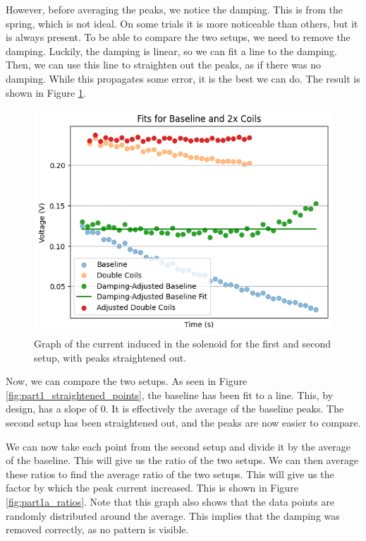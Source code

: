 \documentclass[11pt]{article}
\begin{document}
    However, before averaging the peaks, we notice the damping.
    This is from the spring, which is not ideal.
    On some trials it is more noticeable than others, but it is always present.
    To be able to compare the two setups, we need to remove the damping.
    Luckily, the damping is linear, so we can fit a line to the damping.
    Then, we can use this line to straighten out the peaks, as if there was no damping.
    While this propagates some error, it is the best we can do.
    The result is shown in Figure \ref{fig:part1a_straightened_points}.

    \begin{figure}[H]
        \centering
        \includegraphics[width=0.8\linewidth]{resources/images/part1a peaks straightened}
        \caption{Graph of the current induced in the solenoid for the first and second setup, with peaks straightened out.}
        \label{fig:part1a_straightened_points}
    \end{figure}

    Now, we can compare the two setups.
    As seen in Figure \ref{fig:part1_straightened_points}, the baseline has been fit to a line.
    This, by design, has a slope of 0.
    It is effectively the average of the baseline peaks.
    The second setup has been straightened out, and the peaks are now easier to compare.

    We can now take each point from the second setup and divide it by the average of the baseline.
    This will give us the ratio of the two setups.
    We can then average these ratios to find the average ratio of the two setups.
    This will give us the factor by which the peak current increased.
    This is shown in Figure \ref{fig:part1a_ratios}.
    Note that this graph also shows that the data points are randomly distributed around the average.
    This implies that the damping was removed correctly, as no pattern is visible.
\end{document}
